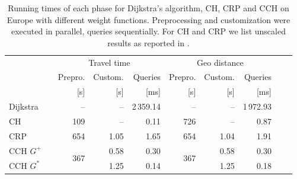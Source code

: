 \documentclass[a4paper, english, cleveref]{lipics-v2021}
\begin{document}
\begin{table}
\centering
\caption{
Running times of each phase for Dijkstra's algorithm, CH, CRP and CCH on Europe with different weight functions.
Preprocessing and customization were executed in parallel, queries sequentially.
For CH and CRP we list unscaled results as reported in \cite{DellingGPW17}.
}\label{tab:related_work}
\begin{tabular}{l@{\hskip4pt}crrrrrrrr}
\toprule
{}       &                     & \multicolumn{3}{c}{Travel time}                              & \multicolumn{3}{c}{Geo distance}   \\
                                 \cmidrule(lr){3-5}                                             \cmidrule(lr){6-8}
{}       &                     &             Prepro.  &            Custom. &          Queries &              Prepro. & Custom. &    Queries \\
{}       &                     &                 [s]  &                [s] &             [ms] &                  [s] &     [s] &       [ms] \\
\midrule
Dijkstra &                     &                   -- &                 -- &        2\,359.14 &                   -- &      -- &  1\,972.93 \\
CH       & \cite{DellingGPW17} &                  109 &                 -- &             0.11 &                  726 &      -- &       0.87 \\
CRP      & \cite{DellingGPW17} &                  654 &               1.05 &             1.65 &                  654 &    1.04 &       1.91 \\
\addlinespace
CCH $G^+$ &                    & \multirow{2}{*}{367} &               0.58 &             0.30 & \multirow{2}{*}{367} &    0.58 &       0.30 \\
CCH $G^*$ &                    &                      &               1.25 &             0.14 &                      &    1.25 &       0.18 \\
\bottomrule
\end{tabular}
\end{table}
\end{document}
